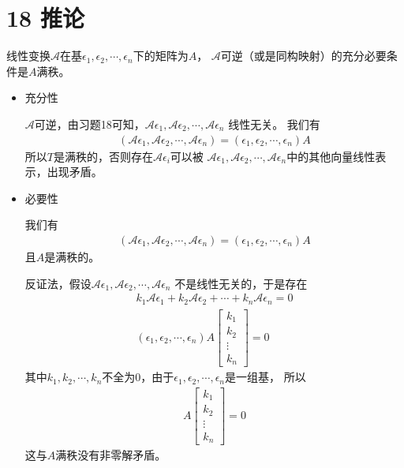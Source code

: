 \documentclass{article}
\begin{document}
\section*{18 推论}

线性变换$\mathscr{A}$在基$\epsilon_1, \epsilon_2, \cdots, \epsilon_n$下的矩阵为$A$，
$\mathscr{A}$可逆（或是同构映射）的充分必要条件是$A$满秩。

\begin{itemize}
  \item 充分性

        $\mathscr{A}$可逆，由习题18可知，$\mathscr{A}\epsilon_1, \mathscr{A}\epsilon_2, \cdots, \mathscr{A}\epsilon_n$
        线性无关。
        我们有
        \begin{align*}
          (\mathscr{A}\epsilon_1, \mathscr{A}\epsilon_2, \cdots, \mathscr{A}\epsilon_n)
          = (\epsilon_1, \epsilon_2, \cdots, \epsilon_n) A
        \end{align*}
        所以$T$是满秩的，否则存在$\mathscr{A}\epsilon_i$可以被
        $\mathscr{A}\epsilon_1, \mathscr{A}\epsilon_2, \cdots, \mathscr{A}\epsilon_n$中的其他向量线性表示，出现矛盾。

  \item 必要性

        我们有
        \begin{align*}
          (\mathscr{A}\epsilon_1, \mathscr{A}\epsilon_2, \cdots, \mathscr{A}\epsilon_n)
          = (\epsilon_1, \epsilon_2, \cdots, \epsilon_n) A
        \end{align*}
        且$A$是满秩的。

        反证法，假设$\mathscr{A}\epsilon_1, \mathscr{A}\epsilon_2, \cdots, \mathscr{A}\epsilon_n$
        不是线性无关的，于是存在
        \begin{align*}
          k_1 \mathscr{A}\epsilon_1 + k_2 \mathscr{A}\epsilon_2 + \cdots + k_n \mathscr{A}\epsilon_n = 0 \\
          (\epsilon_1, \epsilon_2, \cdots, \epsilon_n) A \begin{bmatrix}
                                                           k_1    \\
                                                           k_2    \\
                                                           \vdots \\
                                                           k_n
                                                         \end{bmatrix} = 0
        \end{align*}
        其中$k_1, k_2, \cdots, k_n$不全为0，由于$\epsilon_1, \epsilon_2, \cdots, \epsilon_n$是一组基，
        所以
        \begin{align*}
          A \begin{bmatrix}
              k_1    \\
              k_2    \\
              \vdots \\
              k_n
            \end{bmatrix} = 0
        \end{align*}
        这与$A$满秩没有非零解矛盾。
\end{itemize}
\end{document}
